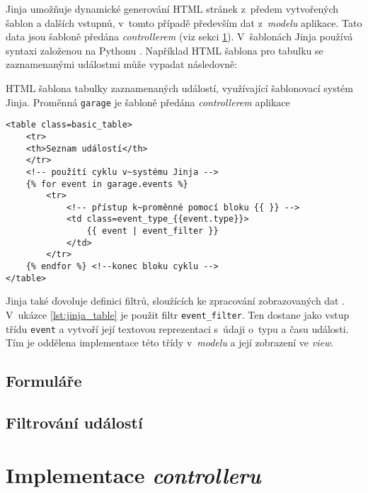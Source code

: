 Jinja umožňuje dynamické generování HTML stránek z~předem vytvořených šablon a dalších vstupnů, v~tomto případě především dat z~\textit{modelu} aplikace. Tato data jsou šabloně předána \textit{controllerem} (viz sekci \ref{sec:im_controller}). V~šablonách Jinja používá syntaxi založenou na Pythonu \cite{jinja}. Například HTML šablona pro tabulku se zaznamenanými událostmi může vypadat následovně:

\begin{listing}[htbp]
\caption{\label{lst:jinja_table} HTML šablona tabulky zaznamenaných událostí, využívající šablonovací systém Jinja. Proměnná \texttt{garage} je šabloně předána \textit{controllerem} aplikace}
\begin{verbatim}
<table class=basic_table>
    <tr>
    <th>Seznam událostí</th>
    </tr>
    <!-- použítí cyklu v~systému Jinja -->
    {% for event in garage.events %}
        <tr>
            <!-- přístup k~proměnné pomocí bloku {{ }} -->
            <td class=event_type_{{event.type}}>
                {{ event | event_filter }}
            </td>
        </tr>
    {% endfor %} <!--konec bloku cyklu -->
</table>
\end{verbatim}
\end{listing}

Jinja také ďovoluje definici filtrů, sloužících ke zpracování zobrazovaných dat \cite{jinja}. V~ukázce \ref{lst:jinja_table} je použit filtr \texttt{event\_filter}. Ten dostane jako vstup třídu \texttt{event} a vytvoří její textovou reprezentaci s~údaji o~typu a času události. Tím je oddělena implementace této třídy v~\textit{modelu} a její zobrazení ve \textit{view}.

\subsection{Formuláře}

\subsection{Filtrování událostí}

\section{Implementace \textit{controlleru}}
\label{sec:im_controller}


